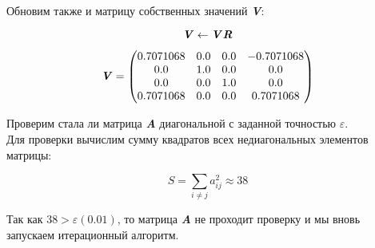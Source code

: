 \documentclass[a4paper, 14pt]{extarticle}
\begin{document}
Обновим также и матрицу собственных значений \textbf{\textit{V}}:

\begin{equation*}
  \textbf{\textit{V}} \leftarrow \textbf{\textit{V}} \textbf{\textit{R}}
\end{equation*}

\begin{equation*}
  \textbf{\textit{V}} = \begin{pmatrix}
    0.7071068 & 0.0 & 0.0 & -0.7071068 \\
    0.0 & 1.0 & 0.0 & 0.0 \\
    0.0 & 0.0 & 1.0 & 0.0 \\
    0.7071068 & 0.0 & 0.0 & 0.7071068 \\
    \end{pmatrix}
\end{equation*}

Проверим стала ли матрица \textbf{\textit{A}} диагональной с заданной точностью $\varepsilon$.\\
Для проверки вычислим сумму квадратов всех недиагональных элементов матрицы:

\begin{equation*}
  S = \sum_{i \neq j} a_{ij}^2 \approx 38
\end{equation*}

Так как $38 > \varepsilon (0.01)$, то матрица \textbf{\textit{A}} не проходит проверку и мы вновь
запускаем итерационный алгоритм.\\

\end{document}
